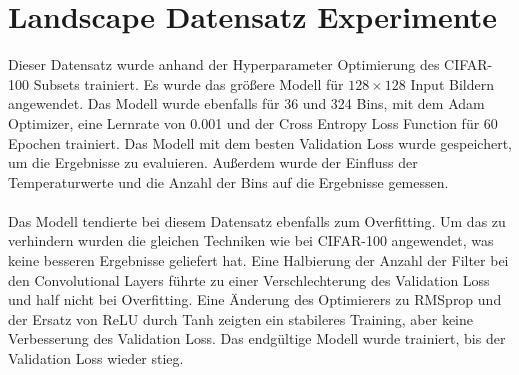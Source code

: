 \section{Landscape Datensatz Experimente}
Dieser Datensatz wurde anhand der Hyperparameter Optimierung des CIFAR-100 Subsets trainiert. Es wurde das größere Modell für $128 \times 128$
Input Bildern angewendet. Das Modell wurde ebenfalls für 36 und 324 Bins, mit dem Adam Optimizer, eine Lernrate von 0.001 und der Cross Entropy 
Loss Function für 60 Epochen trainiert. Das Modell mit dem besten Validation Loss wurde gespeichert, um die Ergebnisse zu evaluieren. Außerdem
wurde der Einfluss der Temperaturwerte und die Anzahl der Bins auf die Ergebnisse gemessen.
\\
\\
Das Modell tendierte bei diesem Datensatz ebenfalls zum Overfitting. Um das zu verhindern wurden die gleichen Techniken wie bei CIFAR-100
angewendet, was keine besseren Ergebnisse geliefert hat. Eine Halbierung der Anzahl der Filter bei den Convolutional Layers führte zu einer Verschlechterung
des Validation Loss und half nicht bei Overfitting. Eine Änderung des Optimierers zu RMSprop und der Ersatz von ReLU durch Tanh zeigten
ein stabileres Training, aber keine Verbesserung des Validation Loss. Das endgültige Modell wurde trainiert, bis der Validation Loss wieder stieg.

